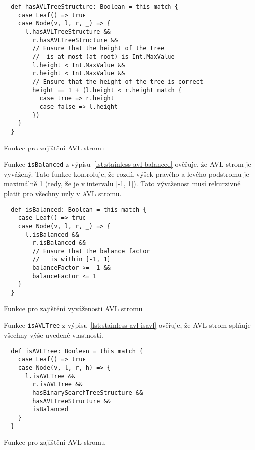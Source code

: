 \begin{listing}[H]
  \begin{verbatim}
  def hasAVLTreeStructure: Boolean = this match {
    case Leaf() => true
    case Node(v, l, r, _) => {
      l.hasAVLTreeStructure &&
        r.hasAVLTreeStructure &&
        // Ensure that the height of the tree
        //  is at most (at root) is Int.MaxValue
        l.height < Int.MaxValue &&
        r.height < Int.MaxValue &&
        // Ensure that the height of the tree is correct
        height == 1 + (l.height < r.height match {
          case true => r.height
          case false => l.height
        })
    }
  }
  \end{verbatim}
  \caption{Funkce pro zajištění AVL stromu}
  \label{lst:stainless-avl-avl}
\end{listing}


Funkce \texttt{isBalanced} z výpisu~\ref{lst:stainless-avl-balanced}
ověřuje, že AVL strom je vyvážený.
Tato funkce kontroluje, že rozdíl výšek pravého a levého podstromu
je maximálně 1 (tedy, že je v intervalu [-1, 1]).
Tato vývaženost musí rekurzivně platit pro všechny uzly v AVL stromu.

\begin{listing}[H]
  \begin{verbatim}
  def isBalanced: Boolean = this match {
    case Leaf() => true
    case Node(v, l, r, _) => {
      l.isBalanced &&
        r.isBalanced &&
        // Ensure that the balance factor
        //   is within [-1, 1]
        balanceFactor >= -1 &&
        balanceFactor <= 1
    }
  }
  \end{verbatim}
  \caption{Funkce pro zajištění vyváženosti AVL stromu}
  \label{lst:stainless-avl-balanced}
\end{listing}

Funkce \texttt{isAVLTree} z výpisu~\ref{lst:stainless-avl-isavl}
ověřuje, že AVL strom splňuje všechny výše uvedené vlastnosti.

\begin{listing}[H]
  \begin{verbatim}
  def isAVLTree: Boolean = this match {
    case Leaf() => true
    case Node(v, l, r, h) => {
      l.isAVLTree &&
        r.isAVLTree &&
        hasBinarySearchTreeStructure &&
        hasAVLTreeStructure &&
        isBalanced
    }
  }
  \end{verbatim}
  \caption{Funkce pro zajištění AVL stromu}
  \label{lst:stainless-avl-isavl}
\end{listing}

